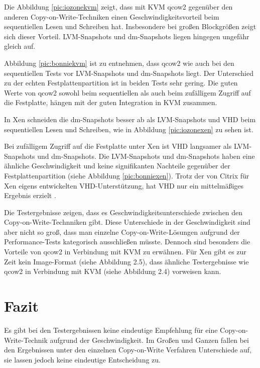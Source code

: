 Die Abbildung \ref{pic:iozonekvm} zeigt, dass mit KVM qcow2 gegenüber den anderen Copy-on-Write-Techniken einen Geschwindigkeitsvorteil beim sequentiellen Lesen und Schreiben hat. Insbesondere bei großen Blockgrößen zeigt sich dieser Vorteil. LVM-Snapshots und dm-Snapshots liegen hingegen ungefähr gleich auf.

Abbildung \ref{pic:bonniekvm} ist zu entnehmen, dass qcow2 wie auch bei den sequentiellen Tests vor LVM-Snapshots und dm-Snapshots liegt. Der Unterschied zu der echten Festplattenpartition ist in beiden Tests sehr gering. Die guten Werte von qcow2 sowohl beim sequentiellen als auch beim zufälligem Zugriff auf die Festplatte, hängen mit der guten Integration in KVM zusammen.

In Xen schneiden die dm-Snapshots besser ab als LVM-Snapshots und VHD beim sequentiellen Lesen und Schreiben, wie in Abbildung \ref{pic:iozonexen} zu sehen ist. 

Bei zufälligem Zugriff auf die Festplatte unter Xen ist VHD langsamer als LVM-Snapshots und dm-Snapshots. Die LVM-Snapshots und dm-Snapshots haben eine ähnliche Geschwindigkeit und keine signifikanten Nachteile gegenüber der Festplattenpartition (siehe Abbildung \ref{pic:bonniexen}). Trotz der von Citrix für Xen eigens entwickelten VHD-Unterstützung, hat VHD nur ein mittelmäßiges Ergebnis erzielt \cite{citrixVHD}. 

Die Testergebnisse zeigen, dass es Geschwindigkeitsunterschiede zwischen den Copy-on-Write-Technniken gibt. Diese Unterschiede in der Geschwindigkeit sind aber nicht so groß, dass man einzelne Copy-on-Write-Lösungen aufgrund der Performance-Tests kategorisch ausschließen müsste. Dennoch sind besonders die Vorteile von qcow2 in Verbindung mit KVM zu erwähnen. Für Xen gibt es zur Zeit kein Image-Format (siehe Abbildung 2.5), dass ähnliche Testergebnisse wie qcow2 in Verbindung mit KVM (siehe Abbildung 2.4) vorweisen kann. 

\section{Fazit}
Es gibt bei den Testergebnissen keine eindeutige Empfehlung für eine Copy-on-Write-Technik aufgrund der Geschwindigkeit. Im Großen und Ganzen fallen bei den Ergebnissen unter den einzelnen Copy-on-Write Verfahren Unterschiede auf, sie lassen jedoch keine eindeutige Entscheidung zu.

